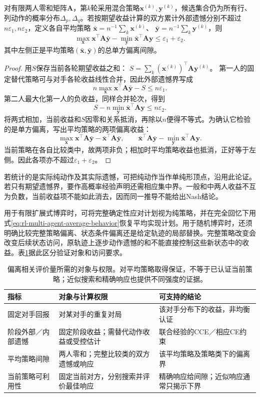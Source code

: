 \begin{theorem}[零和平均策略的鞍点间隙]
\label{thm:rl-multi-agent-average-gap}
对有限两人零和矩阵$\bm A$，第$k$轮采用混合策略$\bm x^{(k)},\bm y^{(k)}$，候选集合仍为所有行、列动作的概率分布$\Delta_p,\Delta_q$。若按期望收益计算的双方累计外部遗憾分别不超过$n\varepsilon_1,n\varepsilon_2$，定义各自平均策略
$\bar{\bm x}=n^{-1}\sum_k\bm x^{(k)}$、
$\bar{\bm y}=n^{-1}\sum_k\bm y^{(k)}$，则
\[
 \max_{\bm x}\bm x^\top\bm A\bar{\bm y}
 -\min_{\bm y}\bar{\bm x}^\top\bm A\bm y
 \leq\varepsilon_1+\varepsilon_2.
\]
其中左侧正是平均策略$(\bar{\bm x},\bar{\bm y})$的总单方偏离间隙。
\end{theorem}
\begin{proof}
用$S$保存当前各轮期望收益之和：
$S=\sum_k(\bm x^{(k)})^\top\bm A\bm y^{(k)}$。
第一人的固定替代策略可与对手各轮收益线性合并，因此外部遗憾界写成
\[
 n\max_{\bm x}\bm x^\top\bm A\bar{\bm y}-S
 \leq n\varepsilon_1.
\]
第二人最大化第一人的负收益，同样合并轮次，得到
\[
 S-n\min_{\bm y}\bar{\bm x}^\top\bm A\bm y
 \leq n\varepsilon_2.
\]
将两式相加，当前收益和$S$因零和关系抵消，再除以$n$便得不等式。为确认它检验的是单方偏离，写出平均策略的两项偏离收益：
\[
 \max_{\bm x}\bm x^\top\bm A\bar{\bm y}
       -\bar{\bm x}^\top\bm A\bar{\bm y},
 \qquad
 \bar{\bm x}^\top\bm A\bar{\bm y}
       -\min_{\bm y}\bar{\bm x}^\top\bm A\bm y.
\]
当前策略在各自比较类中，故两项非负；相加时平均策略收益也抵消，正好等于左侧。因此各项亦不超过$\varepsilon_1+\varepsilon_2$。
\end{proof}

若统计的是实际纯动作及其实际遗憾，可把纯动作当作单纯形顶点，沿用此论证。若只有期望遗憾界，要作高概率经验声明还需相应集中界。一般和中两人收益不互为负数，当前收益项不能如此消去，因而同一推导不能给出Nash结论。

用于有限扩展式博弈时，可将完整确定性应对计划视为纯策略，并在完全回忆下用式\eqref{eq:rl-multi-agent-average-behavior}恢复平均实现计划。用于随机博弈时，还须明确比较完整策略偏离、状态条件偏离还是给定轨迹的局部替换。完整策略改变会改变后续状态访问，原轨迹上逐步动作遗憾的和不能直接控制这些新状态中的收益。表\ref{tab:rl-multi-agent-guarantees}据此区分验证对象和访问要求。

\begin{table}[htbp]
 \centering
 \begin{tabularx}{\linewidth}{@{}l >{\raggedright\arraybackslash}X >{\raggedright\arraybackslash}X@{}}
 \toprule
 指标 & 对象与计算权限 & 可支持的结论\\
 \midrule
 固定对手回报 & 对某对手的重复对局 & 该对手分布下的收益，非均衡认证\\
 阶段外部／内部遗憾 & 固定阶段收益；需替代动作收益或受控估计 & 联合经验的CCE／相应CE约束\\
 平均策略间隙 & 两人零和；完整比较类的双方遗憾或响应 & 该平均策略及策略类下的偏离界\\
 当前策略可利用性 & 固定当前对方，分别搜索并评价最佳响应 & 精确响应给间隙；近似响应通常只揭示下界\\
 \bottomrule
 \end{tabularx}
 \caption{偏离相关评价量所需的对象与权限。对平均策略取得保证，不等于已认证当前策略；近似搜索和精确响应也提供不同强度的证据。}
 \label{tab:rl-multi-agent-guarantees}
\end{table}

